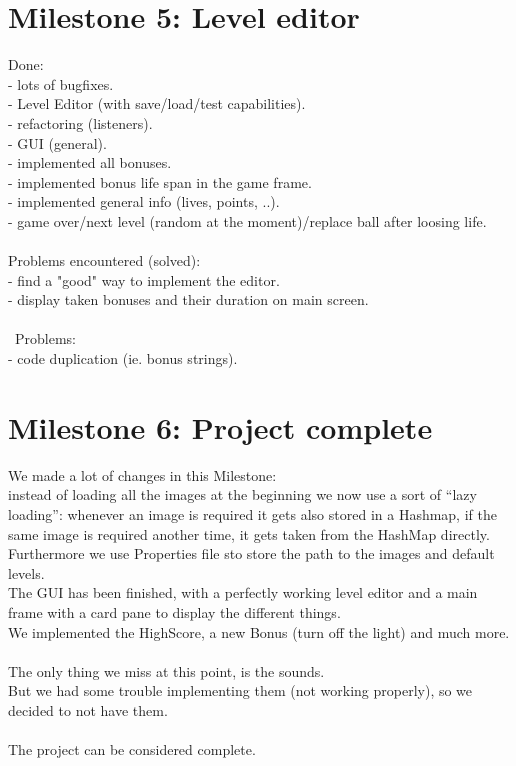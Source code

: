 \section*{Milestone 5: Level editor}
\label{sec:m5}
Done:\\
- lots of bugfixes.\\
- Level Editor (with save/load/test capabilities).\\
- refactoring (listeners).\\
- GUI (general).\\
- implemented all bonuses.\\
- implemented bonus life span in the game frame.\\
- implemented general info (lives, points, ..).\\
- game over/next level (random at the moment)/replace ball after loosing life.\\
\\
Problems encountered (solved): \\
- find a "good" way to implement the editor.\\
- display taken bonuses and their duration on main screen.\\
\\\
Problems: \\
- code duplication (ie. bonus strings).\\

\section*{Milestone 6: Project complete}
\label{sec:m6}
We made a lot of changes in this Milestone:\\
instead of loading all the images at the beginning we now use a sort of  ``lazy loading'': whenever an image is required it gets also stored in a Hashmap, if the same image is required another time, it gets taken from the HashMap directly.\\ 
Furthermore we use Properties file sto store the path to the images and default levels.\\
The GUI has been finished, with a perfectly working level editor and a main frame with a card pane to display the different things.\\
We implemented the HighScore, a new Bonus (turn off the light) and much more.\\
\\
The only thing we miss at this point, is the sounds.\\
But we had some trouble implementing them (not working properly), so we decided to not have them.\\
\\
The project can be considered complete. 